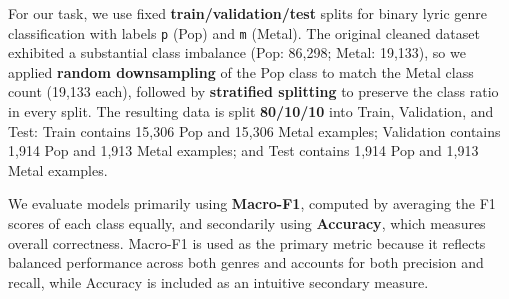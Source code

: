 For our task, we use fixed \textbf{train/validation/test} splits for binary lyric genre classification with labels \texttt{p} (Pop) and \texttt{m} (Metal). The original cleaned dataset exhibited a substantial class imbalance (Pop: 86{,}298; Metal: 19{,}133), so we applied \textbf{random downsampling} of the Pop class to match the Metal class count (19{,}133 each), followed by \textbf{stratified splitting} to preserve the class ratio in every split. The resulting data is split \textbf{80/10/10} into Train, Validation, and Test: Train contains 15{,}306 Pop and 15{,}306 Metal examples; Validation contains 1{,}914 Pop and 1{,}913 Metal examples; and Test contains 1{,}914 Pop and 1{,}913 Metal examples. 

We evaluate models primarily using \textbf{Macro-F1}, computed by averaging the F1 scores of each class equally, and secondarily using \textbf{Accuracy}, which measures overall correctness. Macro-F1 is used as the primary metric because it reflects balanced performance across both genres and accounts for both precision and recall, while Accuracy is included as an intuitive secondary measure. 